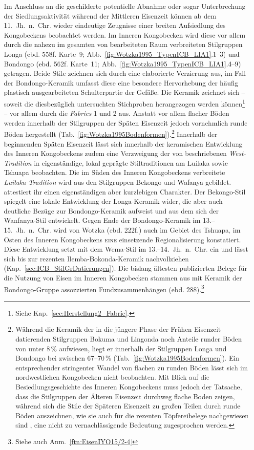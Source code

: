 Im Anschluss an die geschilderte potentielle Abnahme oder sogar Unterbrechung der Siedlungsaktivität während der Mittleren Eisenzeit können ab dem 11.~Jh.~n.~Chr. wieder eindeutige Zeugnisse einer breiten Aufsiedlung des Kongobeckens beobachtet werden. Im Inneren Kongobecken wird diese vor allem durch die nahezu im gesamten von \textcite{Wotzka.1995} bearbeiteten Raum verbreiteten Stilgruppen Longa (ebd. 558f. Karte~9; Abb.~\ref{fig:Wotzka1995_TypenICB_LIA1}.1--3) und Bondongo (ebd. 562f. Karte~11; Abb.~\ref{fig:Wotzka1995_TypenICB_LIA1}.4--9) getragen. Beide Stile zeichnen sich durch eine elaborierte Verzierung aus, im Fall der Bondongo-Keramik umfasst diese eine besondere Hervorhebung der häufig plastisch ausgearbeiteten Schulterpartie der Gefäße. Die Keramik zeichnet sich -- soweit die diesbezüglich untersuchten Stichproben herangezogen werden können\footnote{Siehe Kap.~\ref{sec:Herstellung2_Fabric}.} -- vor allem durch die \textit{Fabrics} 1 und 2 aus. Anstatt vor allem flacher Böden werden innerhalb der Stilgruppen der Späten Eisenzeit jedoch vornehmlich runde Böden hergestellt (Tab.~\ref{fig:Wotzka1995Bodenformen}).\footnote{Während die Keramik der in die jüngere Phase der Frühen Eisenzeit datierenden Stilgruppen Bokuma und Lingonda noch Anteile runder Böden von unter 8\,\% aufwiesen, liegt er innerhalb der Stilgruppen Longa und Bondongo bei zwischen 67--70\,\% (Tab.~\ref{fig:Wotzka1995Bodenformen}). Ein entsprechender stringenter Wandel von flachen zu runden Böden lässt sich im nordwestlichen Kongobecken nicht beobachten. Mit Blick auf die Besiedlungsgeschichte des Inneren Kongobeckens muss jedoch der Tatsache, dass die Stilgruppen der Älteren Eisenzeit durchweg flache Boden zeigen, während sich die Stile der Späteren Eisenzeit zu großen Teilen durch runde Böden auszeichnen, wie sie auch für die rezenten Töpfereibelege nachgewiesen sind \parencite{Eggert.1980c}, eine nicht zu vernachlässigende Bedeutung zugesprochen werden.} Innerhalb der beginnenden Späten Eisenzeit lässt sich innerhalb der keramischen Entwicklung des Inneren Kongobeckens zudem eine Verzweigung der von \textcite[221--223]{Wotzka.1995} beschriebenen \textit{West-Tradition} in eigenständige, lokal geprägte Stiltraditionen am Luilaka sowie Tshuapa beobachten. Die im Süden des Inneren Kongobeckens verbreitete \textit{Luilaka-Tradition} wird aus den Stilgruppen Bekongo und Wafanya gebildet. \textcite{Wotzka.1995} attestiert ihr einen eigenständigen aber kurzlebigen Charakter. Der Bekongo-Stil spiegelt eine lokale Entwicklung der Longa-Keramik wider, die aber auch deutliche Bezüge zur Bondongo-Keramik aufweist und aus dem sich der Wanfanya-Stil entwickelt. Gegen Ende der Bondongo-Keramik im 13.--15.~Jh.~n.~Chr. wird von Wotzka (ebd. 222f.) auch im Gebiet des Tshuapa, im Osten des Inneren Kongobeckens \textsc{eine} einsetzende Regionalisierung konstatiert. Diese Entwicklung setzt mit dem Wema-Stil im 13.--14.~Jh.~n.~Chr. ein und lässt sich bis zur rezenten Ilemba-Bokonda-Keramik nachvollziehen (Kap.~\ref{sec:ICB_StilGrDatierungen}). Die bislang ältesten publizierten Belege für die Nutzung von Eisen im Inneren Kongobecken stammen aus mit Keramik der Bondongo-Gruppe assozzierten Fundzusammenhängen (ebd. 288).\footnote{Siehe auch Anm.~\ref{ftn:EisenIYO15/2-4}} 

